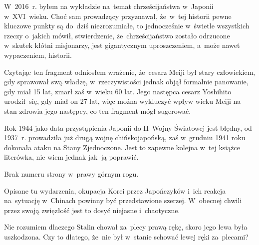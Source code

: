 \documentclass[a4paper,11pt]{article}
\begin{document}
\start {}

\vspace{\spaceFour}


\start {} W~2016~r. byłem na wykładzie na~temat chrześcijaństwa
w~Japonii w~XVI~wieku. Choć sam prowadzący przyznawał, że~w~tej
historii pewne kluczowe punkty są do~dziś niezrozumiałe, to
jednocześnie w~świetle wszystkich rzeczy o~jakich mówił, stwierdzenie,
że~chrześcijaństwo zostało odrzucone w~skutek kłótni misjonarzy, jest
gigantycznym uproszczeniem, a~może nawet wypaczeniem, historii.

\vspace{\spaceFour}


\start {} Czytając ten fragment odniosłem wrażenie, że~cesarz
Meiji był stary człowiekiem, gdy sprawował swą władzę,
w~rzeczywistości jednak objął formalnie panowanie, gdy miał 15 lat,
zmarł zaś w~wieku 60 lat. Jego następca cesarz Yoshihito urodził~się,
gdy miał on 27 lat, więc można wykluczyć wpływ wieku Meiji na stan
zdrowia jego następcy, co ten fragment mógł sugerować.

\vspace{\spaceFour}


\start {}

\vspace{\spaceFour}


\start {} Rok 1944 jako data przystąpienia Japonii do II~Wojny
Światowej jest błędny, od 1937~r. prowadziła już drugą wojnę
chińsko\dywiz japońską, zaś w~grudniu 1941 roku dokonała ataku na
Stany Zjednoczone. Jest to zapewne kolejna w~tej książce literówka,
nie wiem jednak jak~ją poprawić.

\vspace{\spaceFour}


\start {} Brak numeru strony w~prawy górnym rogu.

\vspace{\spaceFour}


\start {} Opisane tu wydarzenia, okupacja Korei przez
Japończyków i~ich reakcja na~sytuację w~Chinach powinny być
przedstawione szerzej. W~obecnej chwili przez swoją zwięzłość jest to
dosyć niejasne i~chaotyczne.

\vspace{\spaceFour}


\start {} Nie rozumiem dlaczego Stalin chował za~plecy prawą
rękę, skoro jego lewa była uszkodzona. Czy to dlatego, że~nie był
w~stanie schować lewej ręki za~plecami?
\end{document}
